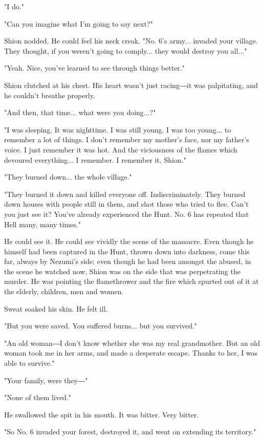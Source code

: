 "I do."

"Can you imagine what I'm going to say next?"

Shion nodded. He could feel his neck creak. "No. 6's army... invaded
your village. They thought, if you weren't going to comply... they would
destroy you all..."

"Yeah. Nice, you've learned to see through things better."

Shion clutched at his chest. His heart wasn't just racing―it was
palpitating, and he couldn't breathe properly.

"And then, that time... what were you doing...?"

"I was sleeping. It was nighttime. I was still young. I was too young...
to remember a lot of things. I don't remember my mother's face, nor my
father's voice. I just remember it was hot. And the viciousness of the
flames which devoured everything... I remember. I remember it, Shion."

"They burned down... the whole village."

"They burned it down and killed everyone off. Indiscriminately. They
burned down houses with people still in them, and shot those who tried
to flee. Can't you just see it? You've already experienced the Hunt. No.
6 has repeated that Hell many, many times."

He could see it. He could see vividly the scene of the massacre. Even
though he himself had been captured in the Hunt, thrown down into
darkness, come this far, always by Nezumi's side; even though he had
been amongst the abused, in the scene he watched now, Shion was on the
side that was perpetrating the murder. He was pointing the flamethrower
and the fire which spurted out of it at the elderly, children, men and
women.

Sweat soaked his skin. He felt ill.

"But you were saved. You suffered burns... but you survived."

"An old woman―I don't know whether she was my real grandmother. But an
old woman took me in her arms, and made a desperate escape. Thanks to
her, I was able to survive."

"Your family, were they―"

"None of them lived."

He swallowed the spit in his mouth. It was bitter. Very bitter.

"So No. 6 invaded your forest, destroyed it, and went on extending its
territory."

